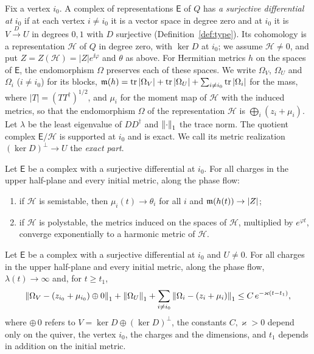 Fix a vertex $i_0$. A complex of representations $\mathsf E$ of $Q$ has
\emph{a surjective differential at $i_0$} if at each vertex $i\neq i_0$ it is
a vector space in degree zero and at $i_0$ it is $V\xrightarrow{D}U$ in
degrees $0,1$ with $D$ surjective (Definition~\ref{def:type}). Its cohomology
is a representation $\mathcal H$ of $Q$ in degree zero, with $\ker D$ at
$i_0$; we assume $\mathcal H\neq0$, and put
$Z=Z(\mathcal H)=|Z|e^{\ii\varphi}$ and $\theta$ as above. For Hermitian
metrics $h$ on the spaces of $\mathsf E$, the endomorphism $\Omega$ preserves
each of these spaces. We write $\Omega_V$, $\Omega_U$ and $\Omega_i$
($i\neq i_0$) for its blocks,
$\mathfrak m(h)=\operatorname{tr}|\Omega_V|+\operatorname{tr}|\Omega_U|+\sum_{i\neq i_0}\operatorname{tr}|\Omega_i|$ for the
mass, where $|T|=(TT^\dagger)^{1/2}$, and $\mu_i$ for the moment map of
$\mathcal H$ with the induced metrics, so that the endomorphism $\Omega$ of
the representation $\mathcal H$ is $\bigoplus_i(z_i+\mu_i)$. Let $\lambda$ be
the least eigenvalue of $DD^\dagger$ and $\left\lVert\cdot\right\rVert_1$ the trace norm. The
quotient complex $\mathsf E/\mathcal H$ is supported at $i_0$ and is exact.
We call its metric realization $(\ker D)^\perp\to U$ the \emph{exact part}.

\begin{theorem}\label{thm:introB}
Let $\mathsf E$ be a complex with a surjective differential at $i_0$. For all
charges in the upper half-plane and every initial metric, along the phase
flow:
\begin{enumerate}
\item[(i)] if $\mathcal H$ is semistable, then $\mu_i(t)\to\theta_i$ for all
 $i$ and $\mathfrak m(h(t))\to|Z|$;
\item[(ii)] if $\mathcal H$ is polystable, the metrics induced on the spaces
 of $\mathcal H$, multiplied by $e^{\varphi t}$, converge exponentially to a
 harmonic metric of $\mathcal H$.
\end{enumerate}
\end{theorem}

\begin{theorem}\label{thm:introA}
Let $\mathsf E$ be a complex with a surjective differential at $i_0$ and
$U\neq0$. For all charges in the upper half-plane and every initial metric,
along the phase flow, $\lambda(t)\to\infty$ and, for $t\geq t_1$,
\[
 \left\lVert\Omega_V-(z_{i_0}+\mu_{i_0})\oplus0\right\rVert_1+\left\lVert\Omega_U\right\rVert_1
 +\sum_{i\neq i_0}\left\lVert\Omega_i-(z_i+\mu_i)\right\rVert_1
 \leq C\,e^{-\varkappa(t-t_1)},
\]
where $\oplus\,0$ refers to $V=\ker D\oplus(\ker D)^\perp$, the constants
$C,\varkappa>0$ depend only on the quiver, the vertex $i_0$, the charges and
the dimensions, and $t_1$ depends in addition on the initial metric.
\end{theorem}

